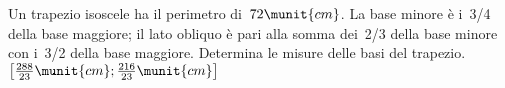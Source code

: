 \begin{htmulticols}{2}
% 
% 
% 
% 
\begin{esercizio}[*]
\label{ese:22.110}
Un trapezio isoscele ha il perimetro di~\(72\munit{cm}\). 
La base minore è i~3/4 della base maggiore; il lato obliquo è pari alla 
somma dei~2/3 della base minore con i~3/2 della base maggiore. 
Determina le misure delle basi del trapezio.
\hfill \(\left[\frac{288}{23}\munit{cm};\frac{216}{23}\munit{cm}\right]\)
\end{esercizio}
% 
% 
% 

\end{htmulticols}
